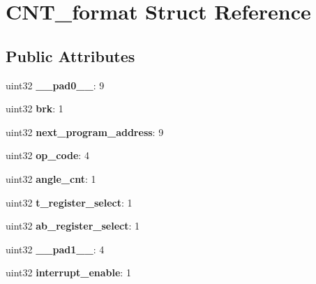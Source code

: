 \hypertarget{structCNT__format}{}\section{C\+N\+T\+\_\+format Struct Reference}
\label{structCNT__format}
\subsection*{Public Attributes}
\begin{DoxyCompactItemize}
\item 
\mbox{\label{structCNT__format_a1137eefff1a73d01743cd3433ab6d424}} 
uint32 {\bfseries \+\_\+\+\_\+pad0\+\_\+\+\_\+}\+: 9
\item 
\mbox{\label{structCNT__format_a380a347401bb030ad1ad979dd00e7e10}} 
uint32 {\bfseries brk}\+: 1
\item 
\mbox{\label{structCNT__format_ad3d6c9fa06499040803d539f9973062a}} 
uint32 {\bfseries next\+\_\+program\+\_\+address}\+: 9
\item 
\mbox{\label{structCNT__format_a28db727be70aa56c90ebdd36eb059402}} 
uint32 {\bfseries op\+\_\+code}\+: 4
\item 
\mbox{\label{structCNT__format_a34e51f9378da15e28b5c6834cca59af3}} 
uint32 {\bfseries angle\+\_\+cnt}\+: 1
\item 
\mbox{\label{structCNT__format_aa5cfba4e3d62a09bb1c515ce0a67b15a}} 
uint32 {\bfseries t\+\_\+register\+\_\+select}\+: 1
\item 
\mbox{\label{structCNT__format_a10199e09afd47efc50d354e5e5b5f9dd}} 
uint32 {\bfseries ab\+\_\+register\+\_\+select}\+: 1
\item 
\mbox{\label{structCNT__format_ab8792768c6f8b8016ca1458e2e707214}} 
uint32 {\bfseries \+\_\+\+\_\+pad1\+\_\+\+\_\+}\+: 4
\item 
\mbox{\label{structCNT__format_a90590a30c523d89c4d275f12f4174320}} 
uint32 {\bfseries interrupt\+\_\+enable}\+: 1

\end{DoxyCompactItemize}
